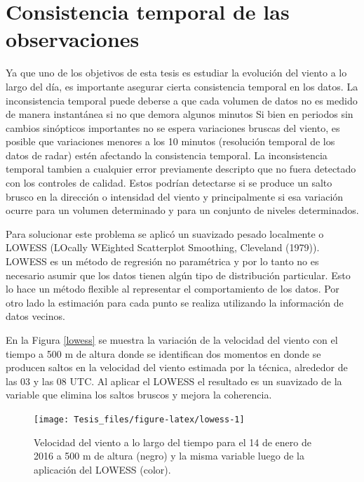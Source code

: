 \documentclass[12pt,spanish,oneside, a4paper]{book}
\begin{document}
\section{Consistencia temporal de las
observaciones}\label{consistencia-temporal-de-las-observaciones}

Ya que uno de los objetivos de esta tesis es estudiar la evolución del
viento a lo largo del día, es importante asegurar cierta consistencia
temporal en los datos. La inconsistencia temporal puede deberse a que
cada volumen de datos no es medido de manera instantánea si no que
demora algunos minutos Si bien en periodos sin cambios sinópticos
importantes no se espera variaciones bruscas del viento, es posible que
variaciones menores a los 10 minutos (resolución temporal de los datos
de radar) estén afectando la consistencia temporal. La inconsistencia
temporal tambien a cualquier error previamente descripto que no fuera
detectado con los controles de calidad. Estos podrían detectarse si se
produce un salto brusco en la dirección o intensidad del viento y
principalmente si esa variación ocurre para un volumen determinado y
para un conjunto de niveles determinados.

Para solucionar este problema se aplicó un suavizado pesado localmente o
LOWESS (LOcally WEighted Scatterplot Smoothing, Cleveland (1979)).
LOWESS es un método de regresión no paramétrica y por lo tanto no es
necesario asumir que los datos tienen algún tipo de distribución
particular. Esto lo hace un método flexible al representar el
comportamiento de los datos. Por otro lado la estimación para cada punto
se realiza utilizando la información de datos vecinos.

En la Figura \ref{lowess} se muestra la variación de la velocidad del
viento con el tiempo a 500 m de altura donde se identifican dos momentos
en donde se producen saltos en la velocidad del viento estimada por la
técnica, alrededor de las 03 y las 08 UTC. Al aplicar el LOWESS el
resultado es un suavizado de la variable que elimina los saltos bruscos
y mejora la coherencia.

\begin{figure}

{\centering \texttt{[image: Tesis\_files/figure-latex/lowess-1]} 

}

\caption{Velocidad del viento a lo largo del tiempo para el 14 de enero de 2016 a 500 m de altura (negro) y la misma variable luego de la aplicación del LOWESS (color). \label{lowess}}\label{fig:lowess}
\end{figure}
\end{document}

